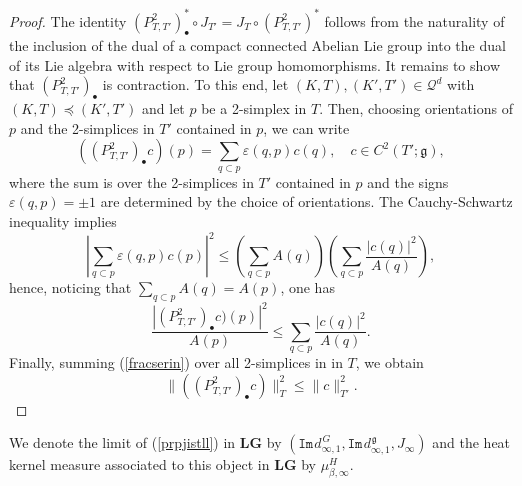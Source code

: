 \documentclass[11pt,reqno]{amsart}
\numberwithin{equation}{section}
\theoremstyle{remark}
\theoremstyle{rmdefinition}
\begin{document}
\begin{proof}
The identity $(P^2_{T,T'})^*_{\bullet}\circ J_{T'} =J_{T}\circ (P^2_{T,T'})^*$  follows from the naturality of the inclusion of the dual of a compact connected Abelian Lie group into the dual of its Lie algebra with respect to Lie group homomorphisms. It remains to show that $(P^2_{T,T'})_{\bullet}$ is  contraction. To this end, let $(K,T), (K',T') \in \mathcal{Q}^d$ with $(K,T)\preceq (K',T')$ and let $p$ be a 2-simplex in $T$. Then, choosing orientations of $p$ and the 2-simplices in $T'$ contained in $p$, we can write
$$
((P^2_{T,T'})_{\bullet}c)(p)=\sum_{q\subset p}\varepsilon(q,p)c(q), \quad c \in C^2(T';\mathfrak{g}),
$$
where the sum is over the 2-simplices in $T'$ contained in $p$ and the signs $\varepsilon(q,p)=\pm 1$ are determined by the choice of orientations. The Cauchy-Schwartz inequality implies
$$
\left|\sum_{q\subset p}\varepsilon(q,p)c(p)\right|^2
\leq
\left(\sum_{q\subset p}A(q)\right)
\left(\sum_{q\subset p}\frac{|c(q)|^2}{A(q)}\right),
$$
hence, noticing that $\sum_{q\subset p}A(q)=A(p)$, one has 
\begin{equation}\label{fracserin}
\frac{|(P^2_{T,T'})_{\bullet}c)(p)|^2}{A(p)}
\leq
\sum_{q\subset p}\frac{|c(q)|^2}{A(q)}.
\end{equation}
Finally, summing (\ref{fracserin}) over all 2-simplices in in $T$, we obtain  
$$\|((P^2_{T,T'})_{\bullet}c)\|^2_{T} \leq \|c\|^2_{T'}.$$
\end{proof}





 We denote the limit of (\ref{prpjistll}) in $\mathbf{LG}$ by $(\mathtt{Im}\hspace{1pt}d_{\infty,1}^{\hspace{1pt}G},
\mathtt{Im}\hspace{1pt}d_{\infty,1}^{\hspace{1pt}\mathfrak g},J_{\infty})$ and the heat kernel measure associated to this object in $\mathbf{LG}$ by $\mu^{H}_{\beta,\infty}$.
\end{document}
